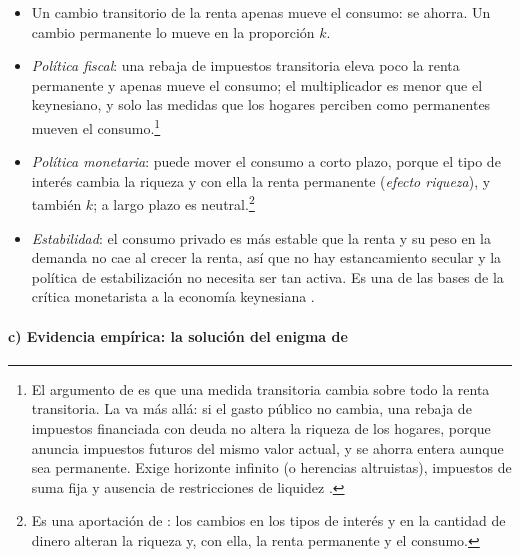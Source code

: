 \documentclass[11pt]{article}
\begin{document}
\begin{itemize}
\item Un cambio transitorio de la renta apenas mueve el consumo: se ahorra. Un cambio permanente lo mueve en la proporción $k$.
\item \emph{Política fiscal}: una rebaja de impuestos transitoria eleva poco la renta permanente y apenas mueve el consumo; el multiplicador es menor que el keynesiano, y solo las medidas que los hogares perciben como permanentes mueven el consumo.\footnote{El argumento de  es que una medida transitoria cambia sobre todo la renta transitoria. La  va más allá: si el gasto público no cambia, una rebaja de impuestos financiada con deuda no altera la riqueza de los hogares, porque anuncia impuestos futuros del mismo valor actual, y se ahorra entera aunque sea permanente\nocite{Barro1974}. Exige horizonte infinito (o herencias altruistas), impuestos de suma fija y ausencia de restricciones de liquidez .}
\item \emph{Política monetaria}: puede mover el consumo a corto plazo, porque el tipo de interés cambia la riqueza y con ella la renta permanente (\emph{efecto riqueza}), y también $k$; a largo plazo es neutral.\footnote{Es una aportación de : los cambios en los tipos de interés y en la cantidad de dinero alteran la riqueza y, con ella, la renta permanente y el consumo.}
\item \emph{Estabilidad}: el consumo privado es más estable que la renta y su peso en la demanda no cae al crecer la renta, así que no hay estancamiento secular y la política de estabilización no necesita ser tan activa. Es una de las bases de la crítica monetarista a la economía keynesiana .
\end{itemize}

\paragraph{c) Evidencia empírica: la solución del enigma de }
\end{document}
